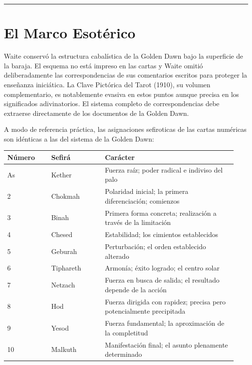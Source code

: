 \begin{center}\rule{0.5\linewidth}{0.5pt}\end{center}

\section{El Marco Esotérico}\label{the-esoteric-framework}

Waite conservó la estructura cabalística de la Golden Dawn bajo la superficie de la baraja. El esquema no está impreso en las cartas y Waite omitió deliberadamente las correspondencias de sus comentarios escritos para proteger la enseñanza iniciática. La Clave Pictórica del Tarot (1910), su volumen complementario, es notablemente evasiva en estos puntos aunque precisa en los significados adivinatorios. El sistema completo de correspondencias debe extraerse directamente de los documentos de la Golden Dawn.

A modo de referencia práctica, las asignaciones sefiroticas de las cartas numéricas son idénticas a las del sistema de la Golden Dawn:

\begin{longtable}[]{@{}>{\RaggedRight\small}p{0.18\linewidth}>{\RaggedRight\small}p{0.22\linewidth}>{\RaggedRight\small}p{0.54\linewidth}@{}}
\toprule\noalign{}
Número & Sefirá & Carácter \\
\midrule\noalign{}
\endhead
\bottomrule\noalign{}
\endlastfoot
As & Kether & Fuerza raíz; poder radical e indiviso del palo \\
2 & Chokmah & Polaridad inicial; la primera diferenciación; comienzos \\
3 & Binah & Primera forma concreta; realización a través de la limitación \\
4 & Chesed & Estabilidad; los cimientos establecidos \\
5 & Geburah & Perturbación; el orden establecido alterado \\
6 & Tiphareth & Armonía; éxito logrado; el centro solar \\
7 & Netzach & Fuerza en busca de salida; el resultado depende de la acción \\
8 & Hod & Fuerza dirigida con rapidez; precisa pero potencialmente precipitada \\
9 & Yesod & Fuerza fundamental; la aproximación de la completitud \\
10 & Malkuth & Manifestación final; el asunto plenamente determinado \\
\end{longtable}

